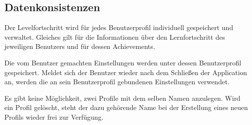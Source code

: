 \subsection{Datenkonsistenzen}

\begin{requirements}
  		
  	 Der Levelfortschritt wird für jedes Benutzerprofil individuell gespeichert und verwaltet. Gleiches gilt für die Informationen über den Lernfortschritt des jeweiligen Benutzers und für dessen Achievements.
  		
	 Die vom Benutzer gemachten Einstellungen werden unter dessen Benutzerprofil gespeichert. Meldet sich der Benutzer wieder nach dem Schließen der Application an, werden die an sein Benutzerprofil gebundenen Einstellungen verwendet.
	
	 Es gibt keine Möglichkeit, zwei Profile mit dem selben Namen anzulegen. Wird ein Profil gelöscht, steht der dazu gehörende Name bei der Erstellung eines neuen Profils wieder frei zur Verfügung.

\end{requirements}	
